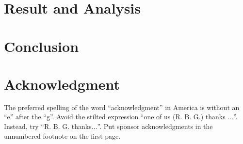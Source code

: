 \documentclass[conference, a4paper]{IEEEtran}
\begin{document}
\section{Result and Analysis}

\section{Conclusion}

\section{Acknowledgment}

The preferred spelling of the word ``acknowledgment'' in America is without 
an ``e'' after the ``g''. Avoid the stilted expression ``one of us (R. B. 
G.) thanks $\ldots$''. Instead, try ``R. B. G. thanks$\ldots$''. Put sponsor 
acknowledgments in the unnumbered footnote on the first page.



\end{document}
